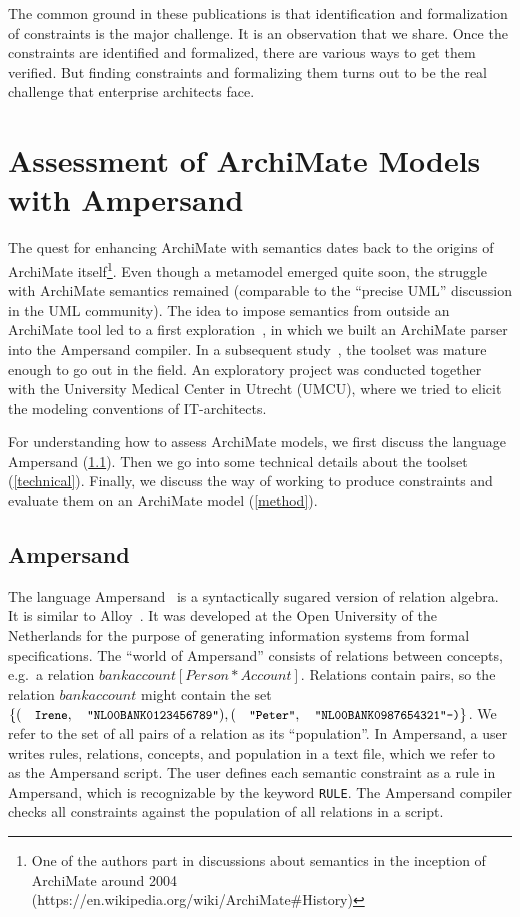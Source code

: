 \documentclass[sn-vancouver]{sn-jnl}%
\theoremstyle{thmstyleone}%
\theoremstyle{thmstyletwo}%
\theoremstyle{thmstylethree}%
\begin{document}
The common ground in these publications is that identification and formalization of constraints is the major challenge.
It is an observation that we share.
Once the constraints are identified and formalized, there are various ways to get them verified.
But finding constraints and formalizing them turns out to be the real challenge that enterprise architects face.

\section{Assessment of ArchiMate Models with Ampersand}\label{toolset}
The quest for enhancing ArchiMate with semantics dates back to the origins of ArchiMate itself\footnote{One of the authors part in discussions about semantics in the inception of ArchiMate around 2004 (https://en.wikipedia.org/wiki/ArchiMate\#History)}.
Even though a metamodel emerged quite soon, the struggle with ArchiMate semantics remained (comparable to the ``precise UML'' discussion in the UML community).
The idea to impose semantics from outside an ArchiMate tool led to a first exploration~\cite{filetenterprise},
in which we built an ArchiMate parser into the Ampersand compiler.
In a subsequent study~\cite{iceis22}, the toolset was mature enough to go out in the field.
An exploratory project was conducted together with the University Medical Center in Utrecht (UMCU),
where we tried to elicit the modeling conventions of IT-architects.

For understanding how to assess ArchiMate models, we first discuss the language Ampersand (\ref{Ampersand}).
Then we go into some technical details about the toolset (\ref{technical}).
Finally, we discuss the way of working to produce constraints and evaluate them on an ArchiMate model (\ref{method}).

\subsection{Ampersand}\label{Ampersand}
The language Ampersand~\cite{joosten2018relation} is a syntactically sugared version of relation algebra.
It is similar to Alloy~\cite{Alloy2006}.
It was developed at the Open University of the Netherlands for the purpose of generating information systems from formal specifications.
The ``world of Ampersand'' consists of relations between concepts, e.g.\ a relation $bankaccount[Person*Account]$.
Relations contain pairs, so the relation $bankaccount$ might contain the set $\{(\text{\small\tt Irene},\text{\small\tt "NL00BANK0123456789"}),(\text{\small\tt "Peter"},\text{\small\tt "NL00BANK0987654321"-)}\}$.
We refer to the set of all pairs of a relation as its ``population''.
In Ampersand, a user writes rules, relations, concepts, and population in a text file, which we refer to as the Ampersand script.
The user defines each semantic constraint as a rule in Ampersand, which is recognizable by the keyword {\small\tt RULE}.
The Ampersand compiler checks all constraints against the population of all relations in a script.
\end{document}
